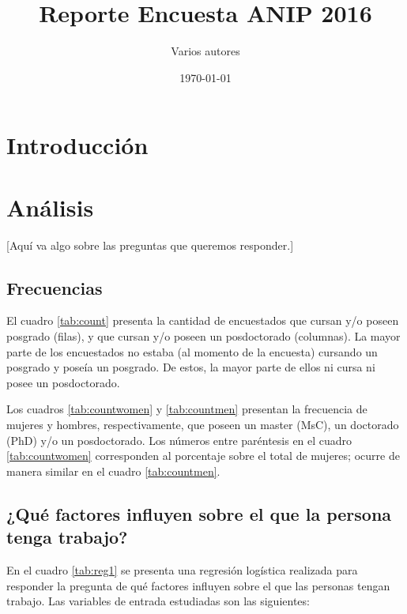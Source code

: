 \documentclass{article}
\title{Reporte Encuesta ANIP 2016}
\author{Varios autores}
\date{\today}
\begin{document}
\maketitle

\section{Introducción}

\section{Análisis}

[Aquí va algo sobre las preguntas que queremos responder.]


\subsection{Frecuencias}

El cuadro \ref{tab:count} presenta la cantidad de encuestados que cursan y/o poseen posgrado (filas), y que cursan y/o poseen un posdoctorado (columnas). La mayor parte de los encuestados no estaba (al momento de la encuesta) cursando un posgrado y poseía un posgrado. De estos, la mayor parte de ellos ni cursa ni posee un posdoctorado.

Los cuadros \ref{tab:countwomen} y \ref{tab:countmen} presentan la frecuencia de mujeres y hombres, respectivamente, que poseen un master (MsC), un doctorado (PhD) y/o un posdoctorado. Los números entre paréntesis en el cuadro \ref{tab:countwomen} corresponden al porcentaje sobre el total de mujeres; ocurre de manera similar en el cuadro \ref{tab:countmen}.





\subsection{¿Qué factores influyen sobre el que la persona tenga trabajo?}


En el cuadro \ref{tab:reg1} se presenta una regresión logística realizada para responder la pregunta de qué factores influyen sobre el que las personas tengan trabajo. Las variables de entrada estudiadas son las siguientes:
\end{document}
